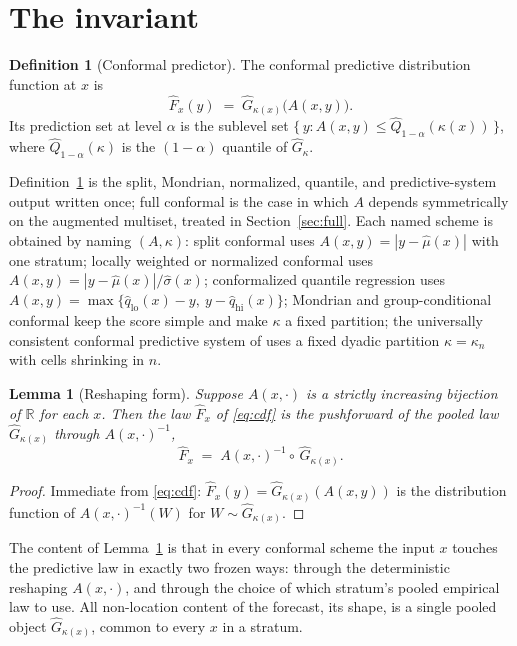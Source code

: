 \documentclass[11pt]{article}
\newtheorem{lemma}[theorem]{Lemma}
\theoremstyle{definition}
\newtheorem{definition}[theorem]{Definition}
\theoremstyle{remark}
\newcommand{\R}{\mathbb{R}}
\begin{document}
\section{The invariant}

\begin{definition}[Conformal predictor]\label{def:conf}
The conformal predictive distribution function at $x$ is
\begin{equation}\label{eq:cdf}
  \widehat F_x(y) \;=\; \widehat G_{\kappa(x)}\!\big( A(x,y) \big) .
\end{equation}
Its prediction set at level $\alpha$ is the sublevel set
$\{\, y : A(x,y) \le \widehat Q_{1-\alpha}(\kappa(x)) \,\}$, where
$\widehat Q_{1-\alpha}(\kappa)$ is the $(1-\alpha)$ quantile of $\widehat G_\kappa$.
\end{definition}

Definition~\ref{def:conf} is the split, Mondrian, normalized, quantile, and
predictive-system output written once; full conformal is the case in which $A$ depends
symmetrically on the augmented multiset, treated in Section~\ref{sec:full}. Each named
scheme is obtained by naming $(A,\kappa)$: split conformal uses
$A(x,y) = |y - \widehat\mu(x)|$ with one stratum; locally weighted or normalized
conformal uses $A(x,y) = |y - \widehat\mu(x)|/\widehat\sigma(x)$; conformalized quantile
regression uses $A(x,y) = \max\{\widehat q_{\mathrm{lo}}(x) - y,\ y - \widehat
q_{\mathrm{hi}}(x)\}$; Mondrian and group-conditional conformal keep the score simple and
make $\kappa$ a fixed partition; the universally consistent conformal predictive system
of \citet{vovk2022universal} uses a fixed dyadic partition $\kappa = \kappa_n$ with cells
shrinking in $n$.

\begin{lemma}[Reshaping form]\label{lem:invariant}
Suppose $A(x,\cdot)$ is a strictly increasing bijection of $\R$ for each $x$. Then the
law $\widehat F_x$ of \eqref{eq:cdf} is the pushforward of the pooled law
$\widehat G_{\kappa(x)}$ through $A(x,\cdot)^{-1}$,
\[
  \widehat F_x \;=\; A(x,\cdot)^{-1} \!\circ\, \widehat G_{\kappa(x)} .
\]
\end{lemma}

\begin{proof}
Immediate from \eqref{eq:cdf}: $\widehat F_x(y) = \widehat G_{\kappa(x)}(A(x,y))$ is the
distribution function of $A(x,\cdot)^{-1}(W)$ for $W \sim \widehat G_{\kappa(x)}$.
\end{proof}

The content of Lemma~\ref{lem:invariant} is that in every conformal scheme the input $x$
touches the predictive law in exactly two frozen ways: through the deterministic
reshaping $A(x,\cdot)$, and through the choice of which stratum's pooled empirical law
to use. All non-location content of the forecast, its shape, is a single pooled object
$\widehat G_{\kappa(x)}$, common to every $x$ in a stratum.
\end{document}
